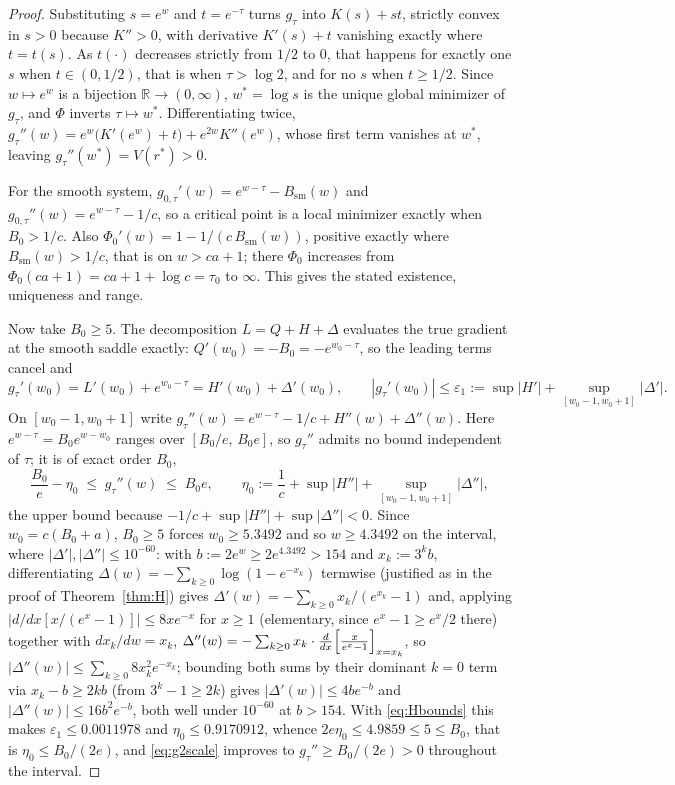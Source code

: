 \documentclass[11pt]{article}
\theoremstyle{definition}
\theoremstyle{remark}
\newcommand{\R}{\mathbb{R}}
\begin{document}
\begin{proof}
Substituting $s=e^w$ and $t=e^{-\tau}$ turns $g_\tau$ into $K(s)+st$, strictly convex in $s>0$
because $K''>0$, with derivative $K'(s)+t$ vanishing exactly where $t = t(s)$. As $t(\cdot)$
decreases strictly from $1/2$ to $0$, that happens for exactly one $s$ when $t\in(0,1/2)$, that
is when $\tau>\log2$, and for no $s$ when $t\ge1/2$. Since $w\mapsto e^w$ is a bijection
$\R\to(0,\infty)$, $w^* = \log s$ is the unique global minimizer of $g_\tau$, and $\Phi$ inverts
$\tau\mapsto w^*$. Differentiating twice, $g_\tau''(w) = e^w\bigl(K'(e^w)+t\bigr)+e^{2w}K''(e^w)$,
whose first term vanishes at $w^*$, leaving $g_\tau''(w^*) = V(r^*)>0$.

For the smooth system, $g_{0,\tau}'(w) = e^{w-\tau}-B_{\mathrm{sm}}(w)$ and $g_{0,\tau}''(w) =
e^{w-\tau}-1/c$, so a critical point is a local minimizer exactly when $B_0 > 1/c$. Also
$\Phi_0'(w) = 1-1/(c\,B_{\mathrm{sm}}(w))$, positive exactly where $B_{\mathrm{sm}}(w)>1/c$, that
is on $w>ca+1$; there $\Phi_0$ increases from $\Phi_0(ca+1) = ca+1+\log c = \tau_0$ to $\infty$.
This gives the stated existence, uniqueness and range.

Now take $B_0\ge5$. The decomposition $L = Q+H+\Delta$ evaluates the true gradient at the smooth
saddle exactly: $Q'(w_0) = -B_0 = -e^{w_0-\tau}$, so the leading terms cancel and
\begin{equation}
\label{eq:gradatw0}
g_\tau'(w_0) = L'(w_0)+e^{w_0-\tau} = H'(w_0)+\Delta'(w_0), \qquad
|g_\tau'(w_0)| \le \varepsilon_1 := \sup|H'|+\sup_{[w_0-1,w_0+1]}|\Delta'| .
\end{equation}
On $[w_0-1,w_0+1]$ write $g_\tau''(w) = e^{w-\tau}-1/c+H''(w)+\Delta''(w)$. Here $e^{w-\tau} =
B_0e^{w-w_0}$ ranges over $[B_0/e,\,B_0e]$, so $g_\tau''$ admits no bound independent of $\tau$;
it is of exact order $B_0$,
\begin{equation}
\label{eq:g2scale}
\frac{B_0}{e}-\eta_0 \;\le\; g_\tau''(w) \;\le\; B_0e, \qquad
\eta_0 := \frac1c+\sup|H''|+\sup_{[w_0-1,w_0+1]}|\Delta''|,
\end{equation}
the upper bound because $-1/c+\sup|H''|+\sup|\Delta''|<0$. Since $w_0 = c(B_0+a)$, $B_0\ge5$ forces
$w_0\ge5.3492$ and so $w\ge4.3492$ on the interval, where $|\Delta'|,|\Delta''|\le10^{-60}$: with
$b:=2e^w\ge2e^{4.3492}>154$ and $x_k:=3^kb$, differentiating $\Delta(w)=-\sum_{k\ge0}\log(1-e^{-x_k})$
termwise (justified as in the proof of Theorem~\ref{thm:H}) gives $\Delta'(w) =
-\sum_{k\ge0}x_k/(e^{x_k}-1)$ and, applying $|d/dx[x/(e^x-1)]|\le8xe^{-x}$ for $x\ge1$ (elementary,
since $e^x-1\ge e^x/2$ there) together with $dx_k/dw=x_k$, $\Delta''(w) = -\sum_{k\ge0}x_k\cdot
\frac{d}{dx}\Bigl[\frac{x}{e^x-1}\Bigr]_{x=x_k}$, so $|\Delta''(w)|\le\sum_{k\ge0}8x_k^2e^{-x_k}$;
bounding both sums by their dominant $k=0$ term via $x_k-b\ge2kb$ (from $3^k-1\ge2k$) gives
$|\Delta'(w)|\le4be^{-b}$ and $|\Delta''(w)|\le16b^2e^{-b}$, both well under $10^{-60}$ at
$b>154$. With \eqref{eq:Hbounds} this makes
$\varepsilon_1 \le 0.0011978$ and $\eta_0 \le 0.9170912$, whence $2e\eta_0 \le 4.9859 \le 5 \le
B_0$, that is $\eta_0 \le B_0/(2e)$, and \eqref{eq:g2scale} improves to $g_\tau''\ge B_0/(2e)>0$
throughout the interval.


\end{proof}
\end{document}
